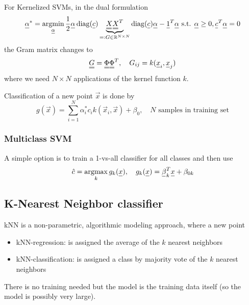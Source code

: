 For Kernelized SVMs, in the dual formulation
\begin{equation}
    \vec{\alpha}^* = \argmin_{\vec{\alpha}} \frac{1}{2} \vec{\alpha} \operatorname{diag}(\vec{c}) \underbrace{\mat{X} \mat{X}^T}_{=:G \in \mathbb{R}^{N\times N}} \operatorname{diag}(\vec{c}) \vec{\alpha} - \vec{1}^T \vec{\alpha} \text{ s.t. } \vec{\alpha} \geq 0, \vec{c}^T \vec{\alpha} = 0
\end{equation}
the Gram matrix changes to
\begin{equation}
    \mat{G} = \mat{\Phi} \mat{\Phi}^T, \quad G_{ij} = k(\vec{x}_i, \vec{x}_j)
\end{equation}
where we need $N\times N$ applications of the kernel function $k$.

Classification of a new point $\vec{x}$ is done by
\begin{equation}
    g(\vec{x}) = \sum_{i=1}^N \alpha_i^* c_i k(\vec{x}_i, \vec{x}) + \beta_0, \quad N \text{ samples in training set}
\end{equation}


\subsubsection{Multiclass SVM}
A simple option is to train a 1-vs-all classifier for all classes and then use
\begin{equation}
    \hat{c} = \argmax_k g_k(\vec{x}), \quad g_k(\vec{x}) = \vec{\beta}_k^T \vec{x} + \beta_{0k}
\end{equation}


\subsection{K-Nearest Neighbor classifier}
kNN is a non-parametric, algorithmic modeling approach, where a new point
\begin{itemize}
    \item kNN-regression: is assigned the average of the $k$ nearest neighbors
    \item kNN-classification: is assigned a class by majority vote of the $k$ nearest neighbors
\end{itemize}
There is \textcolor{green1}{no training needed} but the \textcolor{red1}{model is the training data itself (so the model is possibly very large)}.

